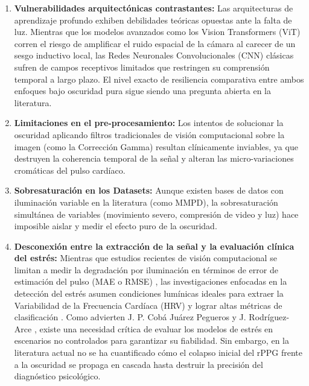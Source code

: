 \begin{enumerate}
    \item \textbf{Vulnerabilidades arquitectónicas contrastantes:} Las arquitecturas de aprendizaje profundo exhiben debilidades teóricas opuestas ante la falta 
    de luz. Mientras que los modelos avanzados como los Vision Transformers (ViT) corren el riesgo de amplificar el ruido espacial de la cámara al carecer de un 
    sesgo inductivo local, las Redes Neuronales Convolucionales (CNN) clásicas sufren de campos receptivos limitados que restringen su comprensión temporal a 
    largo plazo. El nivel exacto de resiliencia comparativa entre ambos enfoques bajo oscuridad pura sigue siendo una pregunta abierta en la literatura.

    \item \textbf{Limitaciones en el pre-procesamiento:} Los intentos de solucionar la oscuridad aplicando filtros tradicionales de visión computacional sobre la 
    imagen (como la Corrección Gamma) resultan clínicamente inviables, ya que destruyen la coherencia temporal de la señal y alteran las micro-variaciones 
    cromáticas del pulso cardíaco.

    \item \textbf{Sobresaturación en los Datasets:} Aunque existen bases de datos con iluminación variable en la literatura (como MMPD), la sobresaturación 
    simultánea de variables (movimiento severo, compresión de video y luz) hace imposible aislar y medir el efecto puro de la oscuridad.

    \item \textbf{Desconexión entre la extracción de la señal y la evaluación clínica del estrés:} Mientras que estudios recientes de visión computacional se 
    limitan a medir la degradación por iluminación en términos de error de estimación del pulso (MAE o RMSE) \cite{chen2024image_en, nguyen2024artifact_resilience}, las investigaciones enfocadas en la detección del 
    estrés asumen condiciones lumínicas ideales para extraer la Variabilidad de la Frecuencia Cardíaca (HRV) y lograr altas métricas de clasificación \cite{fontes2024enhancing, bahameish2024strategies}. Como 
    advierten J. P. Cobá Juárez Pegueros y J. Rodríguez-Arce \cite{rodriguez2025datasets}, existe una necesidad crítica de evaluar los modelos de estrés en escenarios no controlados para 
    garantizar su fiabilidad. Sin embargo, en la literatura actual no se ha cuantificado cómo el colapso inicial del rPPG frente a la oscuridad se propaga en 
    cascada hasta destruir la precisión del diagnóstico psicológico.

\end{enumerate}

